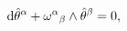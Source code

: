 \begin{equation}
{\rm d} {\hat \theta}^\alpha + {\omega^\alpha}_\beta \wedge {\hat
\theta}^\beta = 0,
\end{equation}


